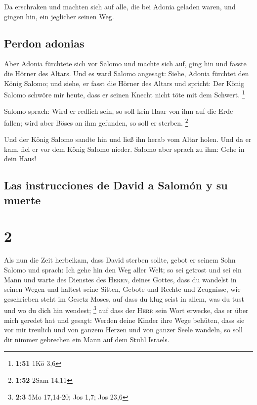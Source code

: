  Da erschraken und machten sich auf alle, die bei Adonia
geladen waren, und gingen hin, ein jeglicher seinen Weg.

\hypertarget{perdon-adonias}{%
\subsection{Perdon adonias}\label{perdon-adonias}}

 Aber Adonia fürchtete sich vor Salomo und machte sich
auf, ging hin und fasste die Hörner des Altars.  Und es
ward Salomo angesagt: Siehe, Adonia fürchtet den König Salomo; und
siehe, er fasst die Hörner des Altars und spricht: Der König Salomo
schwöre mir heute, dass er seinen Knecht nicht töte mit dem Schwert.
\footnote{\textbf{1:51} 1Kö 3,6}

 Salomo sprach: Wird er redlich sein, so soll kein Haar
von ihm auf die Erde fallen; wird aber Böses an ihm gefunden, so soll er
sterben. \footnote{\textbf{1:52} 2Sam 14,11}

 Und der König Salomo sandte hin und ließ ihn herab vom
Altar holen. Und da er kam, fiel er vor dem König Salomo nieder. Salomo
aber sprach zu ihm: Gehe in dein Haus!

\hypertarget{las-instrucciones-de-david-a-salomuxf3n-y-su-muerte}{%
\subsection{Las instrucciones de David a Salomón y su
muerte}\label{las-instrucciones-de-david-a-salomuxf3n-y-su-muerte}}

\hypertarget{section-1}{%
\section{2}\label{section-1}}

 Als nun die Zeit herbeikam, dass David sterben sollte,
gebot er seinem Sohn Salomo und sprach:  Ich gehe hin den
Weg aller Welt; so sei getrost und sei ein Mann  und warte
des Dienstes des \textsc{Herrn}, deines Gottes, dass du wandelst in
seinen Wegen und haltest seine Sitten, Gebote und Rechte und Zeugnisse,
wie geschrieben steht im Gesetz Moses, auf dass du klug seist in allem,
was du tust und wo du dich hin wendest; \footnote{\textbf{2:3} 5Mo
  17,14-20; Jos 1,7; Jos 23,6}  auf dass der \textsc{Herr}
sein Wort erwecke, das er über mich geredet hat und gesagt: Werden deine
Kinder ihre Wege behüten, dass sie vor mir treulich und von ganzem
Herzen und von ganzer Seele wandeln, so soll dir nimmer gebrechen ein
Mann auf dem Stuhl Israels.


